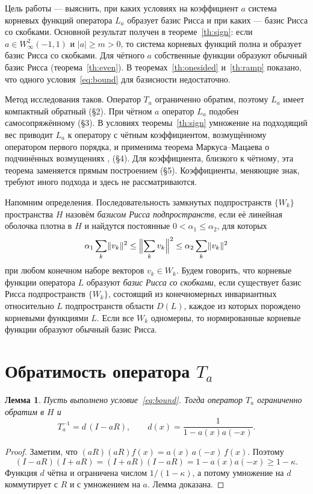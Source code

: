 \documentclass[12pt,a4paper]{article}
\newtheorem{lemma}{Лемма}
\theoremstyle{definition}
\newcommand{\norm}[1]{\lVert#1\rVert}
\newcommand{\abs}[1]{\lvert#1\rvert}
\begin{document}
Цель работы --- выяснить, при каких условиях на коэффициент $a$ система корневых функций
оператора $L_a$ образует базис Рисса и при каких --- базис Рисса со скобками. Основной
результат получен в теореме~\ref{th:sign}: если $a\in W^2_\infty(-1,1)$ и
$\abs a\ge m>0$, то система корневых функций полна и образует базис Рисса со скобками.
Для чётного $a$ собственные функции образуют обычный базис Рисса
(теорема~\ref{th:even}). В теоремах~\ref{th:onesided} и~\ref{th:ramp} показано, что одного
условия~\eqref{eq:bound} для базисности недостаточно.

Метод исследования таков. Оператор $T_a$ ограниченно обратим, поэтому $L_a$ имеет
компактный обратный (\S2). При чётном $a$ оператор $L_a$ подобен самосопряжённому (\S3).
В условиях теоремы~\ref{th:sign} умножение на подходящий вес приводит $L_a$ к оператору с
чётным коэффициентом, возмущённому оператором первого порядка, и применима теорема
Маркуса--Мацаева о подчинённых возмущениях \cite[теорема~6.1]{Wyss},
\cite[теорема~6.6]{Shk} (\S4). Для коэффициента, близкого к чётному, эта теорема
заменяется прямым построением (\S5). Коэффициенты, меняющие знак, требуют иного подхода и
здесь не рассматриваются.

Напомним определения. Последовательность замкнутых подпространств $\{W_k\}$ пространства
$H$ назовём \emph{базисом Рисса подпространств}, если её линейная оболочка плотна в $H$ и
найдутся постоянные $0<\alpha_1\le\alpha_2$, для которых
\[
 \alpha_1\sum_k\norm{v_k}^2\le\Bigl\lVert\sum_kv_k\Bigr\rVert^2\le\alpha_2\sum_k\norm{v_k}^2
\]
при любом конечном наборе векторов $v_k\in W_k$. Будем говорить, что корневые функции
оператора $L$ образуют \emph{базис Рисса со скобками}, если существует базис Рисса
подпространств $\{W_k\}$, состоящий из конечномерных инвариантных относительно $L$
подпространств области $D(L)$, каждое из которых порождено корневыми функциями $L$. Если
все $W_k$ одномерны, то нормированные корневые функции образуют обычный базис Рисса.

\section{Обратимость оператора $T_a$}
\begin{lemma}\label{lem:inverse}
Пусть выполнено условие~\eqref{eq:bound}. Тогда оператор $T_a$ ограниченно обратим в $H$ и
\[
 T_a^{-1}=d\,(I-aR),\qquad d(x)=\frac1{1-a(x)a(-x)}.
\]
\end{lemma}
\begin{proof}
Заметим, что $(aR)(aR)f(x)=a(x)\,a(-x)\,f(x)$. Поэтому
\[
 (I-aR)(I+aR)=(I+aR)(I-aR)=1-a(x)a(-x)\ge1-\kappa .
\]
Функция $d$ чётна и ограничена числом $1/(1-\kappa)$, а потому умножение на $d$
коммутирует с $R$ и с умножением на $a$. Лемма доказана.
\end{proof}
\end{document}
